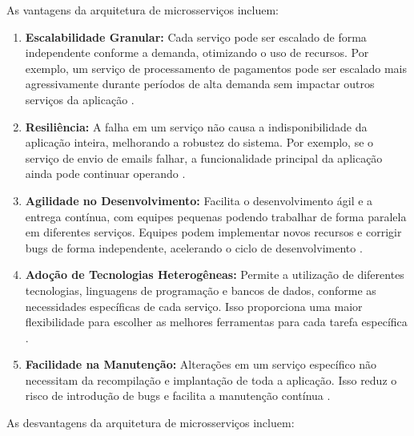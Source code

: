 As vantagens da arquitetura de microsserviços incluem:

\begin{enumerate}
    \item \textbf{Escalabilidade Granular:} Cada serviço pode ser escalado de forma independente conforme a demanda, otimizando o uso de recursos. Por exemplo, um serviço de processamento de pagamentos pode ser escalado mais agressivamente durante períodos de alta demanda sem impactar outros serviços da aplicação \cite{newman2019}.
    \item \textbf{Resiliência:} A falha em um serviço não causa a indisponibilidade da aplicação inteira, melhorando a robustez do sistema. Por exemplo, se o serviço de envio de emails falhar, a funcionalidade principal da aplicação ainda pode continuar operando \cite{dragoni2017}.
    \item \textbf{Agilidade no Desenvolvimento:} Facilita o desenvolvimento ágil e a entrega contínua, com equipes pequenas podendo trabalhar de forma paralela em diferentes serviços. Equipes podem implementar novos recursos e corrigir bugs de forma independente, acelerando o ciclo de desenvolvimento \cite{fowler2014}.
    \item \textbf{Adoção de Tecnologias Heterogêneas:} Permite a utilização de diferentes tecnologias, linguagens de programação e bancos de dados, conforme as necessidades específicas de cada serviço. Isso proporciona uma maior flexibilidade para escolher as melhores ferramentas para cada tarefa específica \cite{richardson2018}.
    \item \textbf{Facilidade na Manutenção:} Alterações em um serviço específico não necessitam da recompilação e implantação de toda a aplicação. Isso reduz o risco de introdução de bugs e facilita a manutenção contínua \cite{newman2019}.
\end{enumerate}

As desvantagens da arquitetura de microsserviços incluem:

